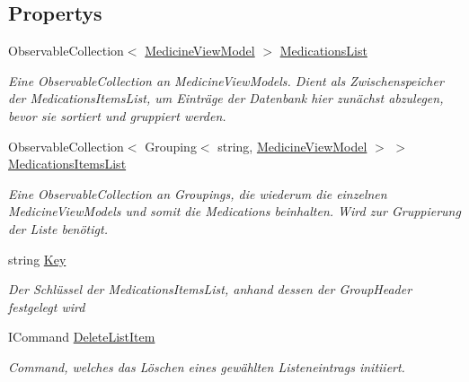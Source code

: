 \subsection*{Propertys}
\begin{DoxyCompactItemize}
\item 
Observable\+Collection$<$ \mbox{\hyperlink{classmy_m_d_1_1_view_model_1_1_medication_tab_view_model_1_1_medicine_view_model}{Medicine\+View\+Model}} $>$ \mbox{\hyperlink{classmy_m_d_1_1_view_model_1_1_medication_tab_view_model_1_1_medication_view_model_a54c6261db8bdb2a1b7bd30893223b859}{Medications\+List}}
\begin{DoxyCompactList}\small\item\em Eine Observable\+Collection an Medicine\+View\+Models. Dient als Zwischenspeicher der Medications\+Items\+List, um Einträge der Datenbank hier zunächst abzulegen, bevor sie sortiert und gruppiert werden. \end{DoxyCompactList}\item 
Observable\+Collection$<$ Grouping$<$ string, \mbox{\hyperlink{classmy_m_d_1_1_view_model_1_1_medication_tab_view_model_1_1_medicine_view_model}{Medicine\+View\+Model}} $>$ $>$ \mbox{\hyperlink{classmy_m_d_1_1_view_model_1_1_medication_tab_view_model_1_1_medication_view_model_a16fb4b8fd866f347b828791564a56ead}{Medications\+Items\+List}}
\begin{DoxyCompactList}\small\item\em Eine Observable\+Collection an Groupings, die wiederum die einzelnen Medicine\+View\+Models und somit die Medications beinhalten. Wird zur Gruppierung der Liste benötigt. \end{DoxyCompactList}\item 
string \mbox{\hyperlink{classmy_m_d_1_1_view_model_1_1_medication_tab_view_model_1_1_medication_view_model_a2f46dfaf9adbc2b5d299d8b6b17c2b6b}{Key}}
\begin{DoxyCompactList}\small\item\em Der Schlüssel der Medications\+Items\+List, anhand dessen der Group\+Header festgelegt wird \end{DoxyCompactList}\item 
I\+Command \mbox{\hyperlink{classmy_m_d_1_1_view_model_1_1_medication_tab_view_model_1_1_medication_view_model_a9a31082ba1957dba80eaeca424c94d40}{Delete\+List\+Item}}
\begin{DoxyCompactList}\small\item\em Command, welches das Löschen eines gewählten Listeneintrags initiiert. \end{DoxyCompactList}\end{DoxyCompactItemize}
